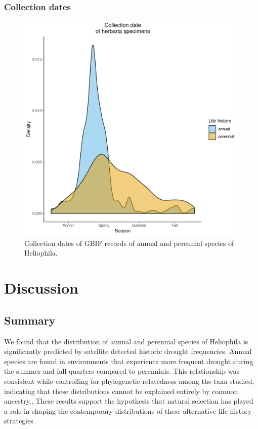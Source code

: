 \documentclass[man,floatsintext]{apa6}
\theoremstyle{definition}
\theoremstyle{definition}
\theoremstyle{definition}
\theoremstyle{remark}
\begin{document}
\hypertarget{collection-dates-1}{%
\subsubsection{Collection dates}\label{collection-dates-1}}




\begin{figure}
\centering
\includegraphics{../figures/collection_dates.pdf}
\caption{\label{fig:collectiondates}Collection dates of GBIF records of annual and
perennial species of Heliophila.}
\end{figure}

\hypertarget{discussion}{%
\section{Discussion}\label{discussion}}

\hypertarget{summary-1}{%
\subsection{Summary}\label{summary-1}}

We found that the distribution of annual and perennial species of
Heliophila is significantly predicted by satellite detected historic
drought frequencies. Annual species are found in environments that
experience more frequent drought during the summer and fall quarters
compared to perennials. This relationship was consistent while
controlling for phylogenetic relatedness among the taxa studied,
indicating that these distributions cannot be explained entirely by
common ancestry., These results support the hypothesis that natural
selection has played a role in shaping the contemporary distributions of
these alternative life-history strategies.
\end{document}

